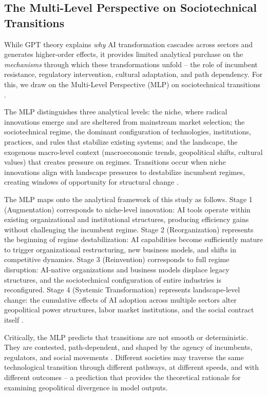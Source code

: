 \documentclass[preprint,review,12pt]{elsarticle}
\begin{document}
\subsection{The Multi-Level Perspective on Sociotechnical Transitions}
\label{sec:mlp}

While GPT theory explains \textit{why} AI transformation cascades across sectors and generates higher-order effects, it provides limited analytical purchase on the \textit{mechanisms} through which these transformations unfold -- the role of incumbent resistance, regulatory intervention, cultural adaptation, and path dependency. For this, we draw on the Multi-Level Perspective (MLP) on sociotechnical transitions \citep{geels2005coevolutionary, geels2011multilevel, geels2020microfoundations}.

The MLP distinguishes three analytical levels: the niche, where radical innovations emerge and are sheltered from mainstream market selection; the sociotechnical regime, the dominant configuration of technologies, institutions, practices, and rules that stabilize existing systems; and the landscape, the exogenous macro-level context (macroeconomic trends, geopolitical shifts, cultural values) that creates pressure on regimes. Transitions occur when niche innovations align with landscape pressures to destabilize incumbent regimes, creating windows of opportunity for structural change \citep{geels2011multilevel, roberts2019accelerated}.

The MLP maps onto the analytical framework of this study as follows. Stage 1 (Augmentation) corresponds to niche-level innovation: AI tools operate within existing organizational and institutional structures, producing efficiency gains without challenging the incumbent regime. Stage 2 (Reorganization) represents the beginning of regime destabilization: AI capabilities become sufficiently mature to trigger organizational restructuring, new business models, and shifts in competitive dynamics. Stage 3 (Reinvention) corresponds to full regime disruption: AI-native organizations and business models displace legacy structures, and the sociotechnical configuration of entire industries is reconfigured. Stage 4 (Systemic Transformation) represents landscape-level change: the cumulative effects of AI adoption across multiple sectors alter geopolitical power structures, labor market institutions, and the social contract itself \citep{geels2020microfoundations, geels2020scenarios, walrave2018mlp}.

Critically, the MLP predicts that transitions are not smooth or deterministic. They are contested, path-dependent, and shaped by the agency of incumbents, regulators, and social movements \citep{geels2020microfoundations, kern2012mlppolicy}. Different societies may traverse the same technological transition through different pathways, at different speeds, and with different outcomes -- a prediction that provides the theoretical rationale for examining geopolitical divergence in model outputs.
\end{document}
